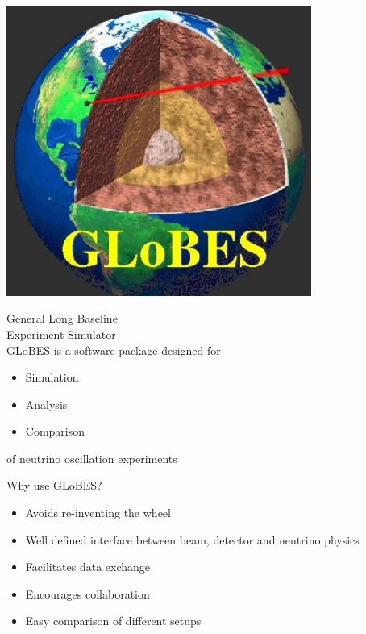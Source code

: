 \documentclass[pdf,ps2pdf,azure,slideColor,colorBG]{prosper}
\begin{document}
\begin{slide}{}

\begin{minipage}{12.5cm}
\includegraphics[angle=0,width=10cm]{globes}
\end{minipage}
\end{slide}
\begin{slide}{}
\vspace*{1cm}

{\Large General Long Baseline\\ Experiment Simulator}\\[1cm]

GLoBES is a software package designed for 
\begin{itemize}
\item Simulation
\item Analysis
\item Comparison
\end{itemize}
of neutrino oscillation experiments

\end{slide}
\begin{slide}{Why use GLoBES?}

\begin{itemize}
\item Avoids re-inventing the wheel
\item Well defined interface between beam, detector and neutrino
  physics
\item Facilitates data exchange
\item Encourages collaboration
\item Easy comparison of different setups

\end{itemize}
\end{slide}
\end{document}
